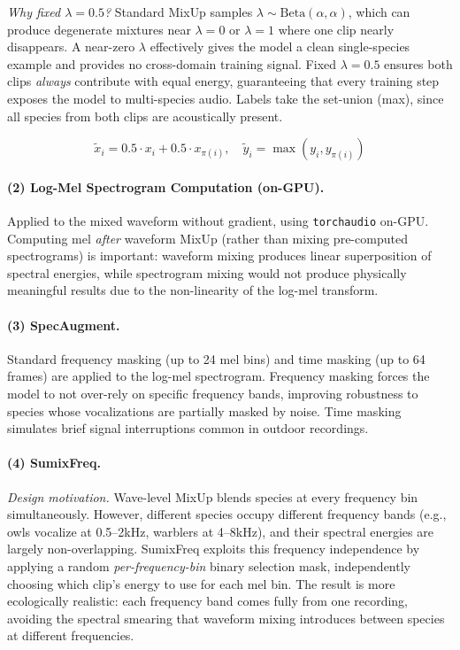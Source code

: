 \documentclass[journal]{IEEEtran}
\begin{document}
\emph{Why fixed $\lambda=0.5$?}
Standard MixUp samples $\lambda \sim \text{Beta}(\alpha, \alpha)$, which can produce degenerate mixtures near $\lambda=0$ or $\lambda=1$ where one clip nearly disappears.
A near-zero $\lambda$ effectively gives the model a clean single-species example and provides no cross-domain training signal.
Fixed $\lambda=0.5$ ensures both clips \emph{always} contribute with equal energy, guaranteeing that every training step exposes the model to multi-species audio.
Labels take the set-union (max), since all species from both clips are acoustically present.

\begin{equation}
  \tilde{x}_i = 0.5 \cdot x_i + 0.5 \cdot x_{\pi(i)}, \quad \tilde{y}_i = \max(y_i, y_{\pi(i)})
\end{equation}

\paragraph{(2) Log-Mel Spectrogram Computation (on-GPU).}
Applied to the mixed waveform without gradient, using \texttt{torchaudio} on-GPU.
Computing mel \emph{after} waveform MixUp (rather than mixing pre-computed spectrograms) is important: waveform mixing produces linear superposition of spectral energies, while spectrogram mixing would not produce physically meaningful results due to the non-linearity of the log-mel transform.

\paragraph{(3) SpecAugment.}
Standard frequency masking (up to 24 mel bins) and time masking (up to 64 frames) are applied to the log-mel spectrogram.
Frequency masking forces the model to not over-rely on specific frequency bands, improving robustness to species whose vocalizations are partially masked by noise.
Time masking simulates brief signal interruptions common in outdoor recordings.

\paragraph{(4) SumixFreq.}
\emph{Design motivation.}
Wave-level MixUp blends species at every frequency bin simultaneously.
However, different species occupy different frequency bands (e.g., owls vocalize at 0.5--2kHz, warblers at 4--8kHz), and their spectral energies are largely non-overlapping.
SumixFreq exploits this frequency independence by applying a random \emph{per-frequency-bin} binary selection mask, independently choosing which clip's energy to use for each mel bin.
The result is more ecologically realistic: each frequency band comes fully from one recording, avoiding the spectral smearing that waveform mixing introduces between species at different frequencies.
\end{document}
